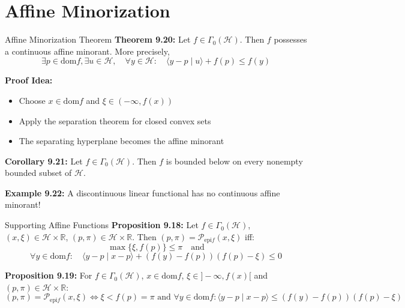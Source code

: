 \documentclass[aspectratio=169,10pt]{beamer}
\begin{document}
\section{Affine Minorization}

\begin{frame}{Affine Minorization Theorem}
\textbf{Theorem 9.20:} Let $f \in \Gamma_0(\mathcal{H})$. Then $f$ possesses a continuous affine minorant. More precisely,
\[
\exists p \in \text{dom} f, \exists u \in \mathcal{H}, \quad \forall y \in \mathcal{H}: \quad \langle y - p \mid u \rangle + f(p) \leq f(y)
\]

\vspace{0.3cm}
\textbf{Proof Idea:} 
\begin{itemize}
    \item Choose $x \in \text{dom} f$ and $\xi \in (-\infty, f(x))$
    \item Apply the separation theorem for closed convex sets
    \item The separating hyperplane becomes the affine minorant
\end{itemize}

\vspace{0.3cm}
\textbf{Corollary 9.21:} Let $f \in \Gamma_0(\mathcal{H})$. Then $f$ is bounded below on every nonempty bounded subset of $\mathcal{H}$.

\vspace{0.3cm}
\textbf{Example 9.22:} A discontinuous linear functional has no continuous affine minorant!
\end{frame}

\begin{frame}{Supporting Affine Functions}
\textbf{Proposition 9.18:} Let $f \in \Gamma_0(\mathcal{H})$, $(x, \xi) \in \mathcal{H} \times \mathbb{R}$, $(p, \pi) \in \mathcal{H} \times \mathbb{R}$. Then $(p, \pi) = \mathcal{P}_{\text{epi} f}(x, \xi)$ iff:
\[
\max\{\xi, f(p)\} \leq \pi \quad \text{and}
\]
\[
\forall y \in \text{dom} f: \quad \langle y - p \mid x - p \rangle + (f(y) - f(p))(f(p) - \xi) \leq 0
\]

\vspace{0.3cm}
\textbf{Proposition 9.19:} For $f \in \Gamma_0(\mathcal{H})$, $x \in \text{dom} f$, $\xi \in ]-\infty, f(x)[$ and $(p, \pi) \in \mathcal{H} \times \mathbb{R}$:
\[
(p, \pi) = \mathcal{P}_{\text{epi} f}(x, \xi) \iff \xi < f(p) = \pi \text{ and } \forall y \in \text{dom} f: \langle y - p \mid x - p \rangle \leq (f(y) - f(p))(f(p) - \xi)
\]
\end{frame}
\end{document}
